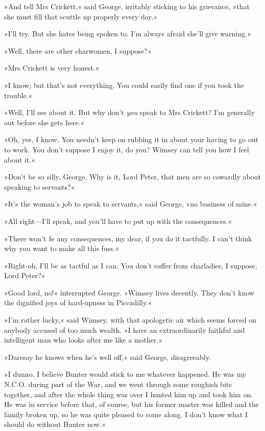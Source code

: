 »And tell Mrs Crickett,« said George, irritably sticking to his grievance, »that she must fill that scuttle up properly every day.«

»I'll try. But she hates being spoken to. I'm always afraid she'll give warning.«

»Well, there are other charwomen, I suppose?«

»Mrs Crickett is very honest.«

»I know; but that's not everything. You could easily find one if you took the trouble.«

»Well, I'll see about it. But why don't \textit{you} speak to Mrs Crickett? I'm generally out before she gets here.«

»Oh, yes, I know. You needn't keep on rubbing it in about your having to go out to work. You don't suppose I enjoy it, do you? Wimsey can tell you how I feel about it.«

»Don't be so silly, George. Why is it, Lord Peter, that men are so cowardly about speaking to servants?«

»It's the woman's job to speak to servants,« said George, »no business of mine.«

»All right\allowbreak---\allowbreak I'll speak, and you'll have to put up with the consequences.«

»There won't \textit{be} any consequences, my dear, if you do it tactfully. I can't think why you want to make all this fuss.«

»Right-oh, I'll be as tactful as I can. You don't suffer from charladies, I suppose, Lord Peter?«

»Good lord, no!« interrupted George. »Wimsey lives decently. They don't know the dignified joys of hard-upness in Piccadilly.«

»I'm rather lucky,« said Wimsey, with that apologetic air which seems forced on anybody accused of too much wealth. »I have an extraordinarily faithful and intelligent man who looks after me like a mother.«

»Daresay he knows when he's well off,« said George, disagreeably.

»I dunno. I believe Bunter would stick to me whatever happened. He was my N.C.O. during part of the War, and we went through some roughish bits together, and after the whole thing was over I hunted him up and took him on. He was in service before that, of course, but his former master was killed and the family broken up, so he was quite pleased to come along. I don't know what I should do without Bunter now.«

